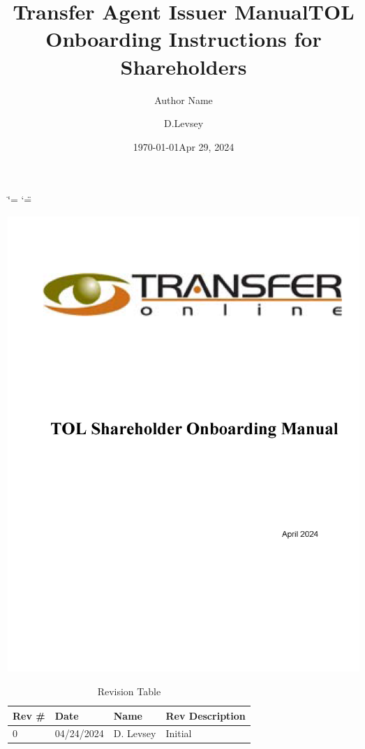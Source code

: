 \documentclass[letterpaper,10pt,english]{sphinxmanual}
\title{Transfer Agent Issuer Manual}
\author{Author Name}
\date{\today}
\title{TOL Onboarding Instructions for Shareholders}
\date{Apr 29, 2024}
\author{D.Levsey}
\begin{document}
\ifdefined\shorthandoff
  \ifnum\catcode`\=\string=\active\shorthandoff{=}\fi
  \ifnum\catcode`\"=\active{}\fi
\fi

\pagestyle{empty}

\begin{titlepage}
\centering
\vspace*{\fill}
\includegraphics[width=\textwidth,height=\textheight,keepaspectratio]{tol_shareholder_onboarding_cover_page.png}
\vspace*{\fill}
\end{titlepage}
\clearpage
    
\pagestyle{plain}
\sphinxtableofcontents
\pagestyle{normal}
\label{\detokenize{index::doc}}


\begin{table}[h!]
\centering
\begin{tabular}{|l|l|l|l|}
\hline
Rev \# & Date & Name & Rev Description \\
\hline
0 & 04/24/2024 & D. Levsey & Initial \\
\hline
\end{tabular}
\caption{Revision Table}
\end{table}
\end{document}
